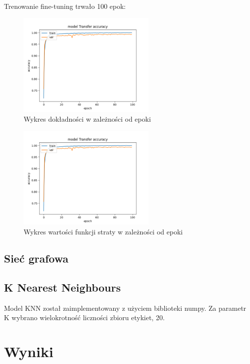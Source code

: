 \documentclass{article}
\begin{document}
Trenowanie fine-tuning trwało 100 epok:

\begin{figure}[H]
    \centering
    \includegraphics[width=0.6\textwidth]{../Saves/Transfer/mnist-784/Transfer_mnist_784_ep100_acc.png}
    \caption{Wykres dokładności w zależności od epoki}
\end{figure}

\begin{figure}[H]
    \centering
    \includegraphics[width=0.6\textwidth]{../Saves/Transfer/mnist-784/Transfer_mnist_784_ep100_loss.png}
    \caption{Wykres wartości funkcji straty w zależności od epoki}
\end{figure}


\subsection{Sieć grafowa}
\subsection{K Nearest Neighbours}
Model KNN został zaimplementowany z użyciem biblioteki numpy. Za parametr K 
wybrano wielokrotność liczności zbioru etykiet, 20.



\section{Wyniki}
\end{document}
